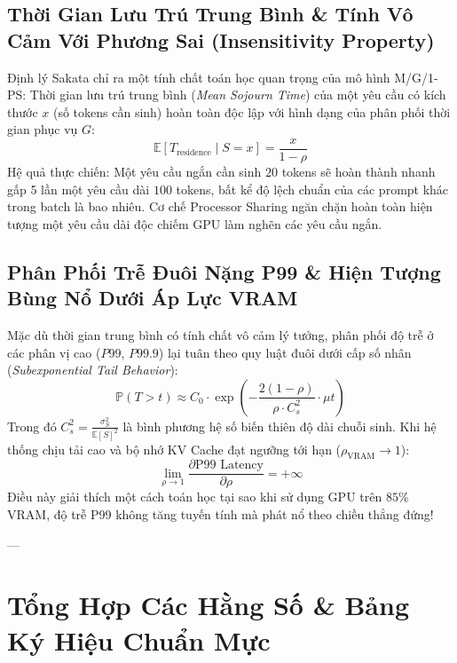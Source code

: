 \subsection{Thời Gian Lưu Trú Trung Bình \& Tính Vô Cảm Với Phương Sai (Insensitivity Property)}
Định lý Sakata chỉ ra một tính chất toán học quan trọng của mô hình M/G/1-PS:
Thời gian lưu trú trung bình (\textit{Mean Sojourn Time}) của một yêu cầu có kích thước $x$ (số tokens cần sinh) hoàn toàn độc lập với hình dạng của phân phối thời gian phục vụ $G$:
\begin{equation}
\mathbb{E}[T_{\text{residence}} \mid S = x] = \frac{x}{1 - \rho}
\end{equation}
Hệ quả thực chiến: Một yêu cầu ngắn cần sinh $20$ tokens sẽ hoàn thành nhanh gấp 5 lần một yêu cầu dài $100$ tokens, bất kể độ lệch chuẩn của các prompt khác trong batch là bao nhiêu. Cơ chế Processor Sharing ngăn chặn hoàn toàn hiện tượng một yêu cầu dài độc chiếm GPU làm nghẽn các yêu cầu ngắn.

\subsection{Phân Phối Trễ Đuôi Nặng P99 \& Hiện Tượng Bùng Nổ Dưới Áp Lực VRAM}
Mặc dù thời gian trung bình có tính chất vô cảm lý tưởng, phân phối độ trễ ở các phân vị cao ($P99$, $P99.9$) lại tuân theo quy luật đuôi dưới cấp số nhân (\textit{Subexponential Tail Behavior}):
\begin{equation}
\mathbb{P}(T > t) \approx C_0 \cdot \exp\left( - \frac{2(1 - \rho)}{\rho \cdot C_s^2} \cdot \mu t \right)
\end{equation}
Trong đó $C_s^2 = \frac{\sigma_S^2}{\mathbb{E}[S]^2}$ là bình phương hệ số biến thiên độ dài chuỗi sinh.
Khi hệ thống chịu tải cao và bộ nhớ KV Cache đạt ngưỡng tới hạn ($\rho_{\text{VRAM}} \to 1$):
\begin{equation}
\lim_{\rho \to 1} \frac{\partial \text{P99 Latency}}{\partial \rho} = +\infty
\end{equation}
Điều này giải thích một cách toán học tại sao khi sử dụng GPU trên $85\%$ VRAM, độ trễ P99 không tăng tuyến tính mà phát nổ theo chiều thẳng đứng!

---

\section{Tổng Hợp Các Hằng Số \& Bảng Ký Hiệu Chuẩn Mực}
\label{sec:app-math-symbols}

